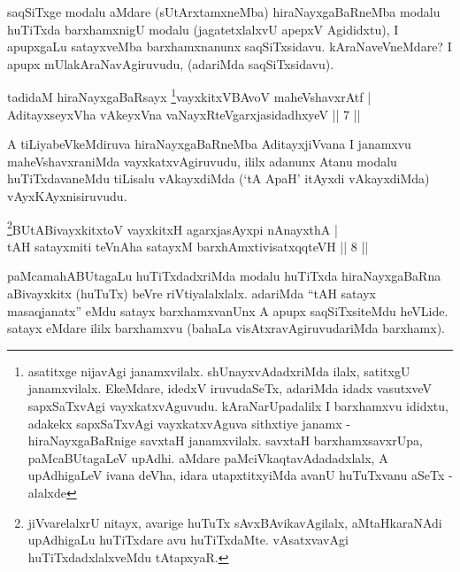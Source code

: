 \begin{artha}
saqSiTxge modalu aMdare (sUtArxtamxneMba) hiraNayxgaBaRneMba modalu huTiTxda barxhamxnigU modalu (jagatetxlalxvU apepxV Agididxtu), I apupxgaLu satayxveMba barxhamxnanunx saqSiTxsidavu. kAraNaveVneMdare? I apupx mUlakAraNavAgiruvudu, (adariMda saqSiTxsidavu).
\end{artha}


\begin{shl}
tadidaM hiraNayxgaBaRsayx \footnote{asatitxge nijavAgi janamxvilalx. shUnayxvAdadxriMda ilalx, satitxgU janamxvilalx. EkeMdare, idedxV iruvudaSeTx, adariMda idadx vasutxveV sapxSaTxvAgi vayxkatxvAguvudu. kAraNarUpadalilx I barxhamxvu ididxtu, adakekx sapxSaTxvAgi vayxkatxvAguva sithxtiye janamx - hiraNayxgaBaRnige savxtaH janamxvilalx. savxtaH barxhamxsavxrUpa, paMcaBUtagaLeV upAdhi. aMdare paMciVkaqtavAdadadxlalx, A upAdhigaLeV ivana deVha, idara utapxtitxyiMda avanU huTuTxvanu aSeTx - alalxde \mdash }vayxkitxVBAvoV maheVshavxrAtf | \\
AditayxseyxVha vAkeyxVna vaNayxRteV\s garxjasidadhxyeV \hfill ||  7 || 
\end{shl}

\begin{artha}
A tiLiyabeVkeMdiruva hiraNayxgaBaRneMba AditayxjiVvana I janamxvu maheVshavxraniMda vayxkatxvAgiruvudu, ililx adanunx Atanu modalu huTiTxdavaneMdu tiLisalu vAkayxdiMda (`tA ApaH' itAyxdi vAkayxdiMda) vAyxKAyxnisiruvudu.
\end{artha}


\begin{shl}
\footnote{jiVvarelalxrU nitayx, avarige huTuTx sAvxBAvikavAgilalx, aMtaHkaraNAdi upAdhigaLu huTiTxdare avu huTiTxdaMte. vAsatxvavAgi huTiTxdadxlalxveMdu tAtapxyaR.}BUtABivayxkitxtoV vayxkitxH agarxjasAyxpi nAnayxthA | \\
tAH satayxmiti teVnA\s \s ha satayxM barxhAmxtivisatxqqteVH \hfill ||  8 || 
\end{shl}

\begin{artha}
paMcamahABUtagaLu huTiTxdadxriMda modalu huTiTxda hiraNayxgaBaRna aBivayxkitx (huTuTx) beVre riVtiyalalxlalx. adariMda ``tAH satayx masaqjanatx'' eMdu satayx barxhamxvanUnx A apupx saqSiTxsiteMdu heVLide. satayx eMdare ililx barxhamxvu (bahaLa visAtxravAgiruvudariMda barxhamx).
\end{artha}




